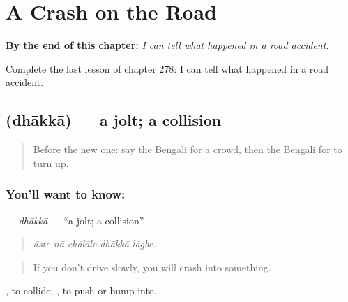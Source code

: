 
\chapter{A Crash on the Road}
\label{ch:bn-a-crash-on-the-road}

\begin{chapteropening}
\textbf{By the end of this chapter:} \emph{I can tell what happened in a road accident.}

Complete the last lesson of chapter 278: I can tell what happened in a road accident.
\end{chapteropening}

\section[\texorpdfstring{\bn{ধাক্কা} (dhākkā)}{ধাক্কা (dhākkā)}]{ (dhākkā) — a jolt; a collision}

\label{lesson:BN-C278-dhakka}



\begin{quote}
Before the new one: say the Bengali for a crowd, then the Bengali for to turn up.
\end{quote}

\subsection*{You'll want to know: }
\textbf{} — \emph{dhākkā} — \textquotedblleft{}a jolt; a collision\textquotedblright{}.

\begin{quote}
    
\end{quote}

\begin{quote}
\emph{āste nā chālāle dhākkā lāgbe.}
\end{quote}

\begin{quote}
If you don't drive slowly, you will crash into something.
\end{quote}

 , to collide;  , to push or bump into.

